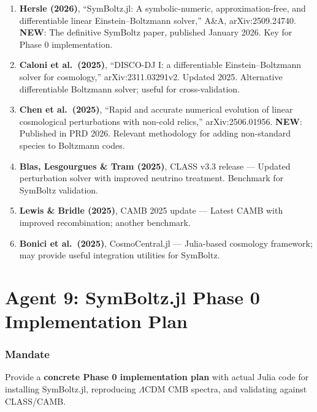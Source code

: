\documentclass[11pt,a4paper]{article}
\newcommand{\NEW}{\textcolor{dfdblue}{\textbf{NEW}}}
\begin{document}
\begin{enumerate}
\item \textbf{Hersle (2026)}, ``SymBoltz.jl: A symbolic-numeric, approximation-free, and differentiable linear Einstein--Boltzmann solver,'' A\&A, arXiv:2509.24740. \NEW: The definitive SymBoltz paper, published January 2026. Key for Phase 0 implementation.

\item \textbf{Caloni et al.\ (2025)}, ``DISCO-DJ I: a differentiable Einstein--Boltzmann solver for cosmology,'' arXiv:2311.03291v2. Updated 2025. Alternative differentiable Boltzmann solver; useful for cross-validation.

\item \textbf{Chen et al.\ (2025)}, ``Rapid and accurate numerical evolution of linear cosmological perturbations with non-cold relics,'' arXiv:2506.01956. \NEW: Published in PRD 2026. Relevant methodology for adding non-standard species to Boltzmann codes.

\item \textbf{Blas, Lesgourgues \& Tram (2025)}, CLASS v3.3 release --- Updated perturbation solver with improved neutrino treatment. Benchmark for SymBoltz validation.

\item \textbf{Lewis \& Bridle (2025)}, CAMB 2025 update --- Latest CAMB with improved recombination; another benchmark.

\item \textbf{Bonici et al.\ (2025)}, CosmoCentral.jl --- Julia-based cosmology framework; may provide useful integration utilities for SymBoltz.
\end{enumerate}


\part{Agent 9: SymBoltz.jl Phase 0 Implementation Plan}
\label{part:agent9}

\section{Mandate}

Provide a \textbf{concrete Phase 0 implementation plan} with actual Julia code for installing SymBoltz.jl, reproducing $\Lambda$CDM CMB spectra, and validating against CLASS/CAMB.
\end{document}
